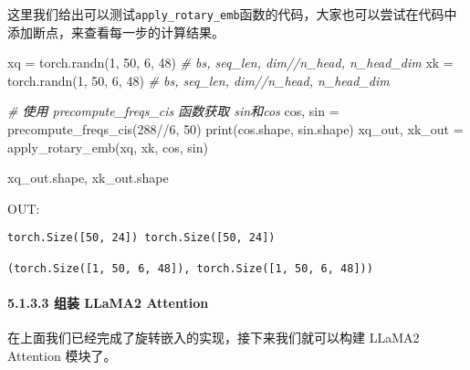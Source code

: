 \documentclass[
]{article}
\newenvironment{Shaded}{}{}
\newcommand{\BuiltInTok}[1]{\textcolor[rgb]{0.00,0.50,0.00}{#1}}
\newcommand{\CommentTok}[1]{\textcolor[rgb]{0.38,0.63,0.69}{\textit{#1}}}
\newcommand{\DecValTok}[1]{\textcolor[rgb]{0.25,0.63,0.44}{#1}}
\newcommand{\NormalTok}[1]{#1}
\newcommand{\OperatorTok}[1]{\textcolor[rgb]{0.40,0.40,0.40}{#1}}
\begin{document}
这里我们给出可以测试\texttt{apply\_rotary\_emb}函数的代码，大家也可以尝试在代码中添加断点，来查看每一步的计算结果。

\begin{Shaded}
\begin{Highlighting}[]
\NormalTok{xq }\OperatorTok{=}\NormalTok{ torch.randn(}\DecValTok{1}\NormalTok{, }\DecValTok{50}\NormalTok{, }\DecValTok{6}\NormalTok{, }\DecValTok{48}\NormalTok{) }\CommentTok{\# bs, seq\_len, dim//n\_head, n\_head\_dim}
\NormalTok{xk }\OperatorTok{=}\NormalTok{ torch.randn(}\DecValTok{1}\NormalTok{, }\DecValTok{50}\NormalTok{, }\DecValTok{6}\NormalTok{, }\DecValTok{48}\NormalTok{) }\CommentTok{\# bs, seq\_len, dim//n\_head, n\_head\_dim}

\CommentTok{\# 使用 precompute\_freqs\_cis 函数获取 sin和cos}
\NormalTok{cos, sin }\OperatorTok{=}\NormalTok{ precompute\_freqs\_cis(}\DecValTok{288}\OperatorTok{//}\DecValTok{6}\NormalTok{, }\DecValTok{50}\NormalTok{)}
\BuiltInTok{print}\NormalTok{(cos.shape, sin.shape)}
\NormalTok{xq\_out, xk\_out }\OperatorTok{=}\NormalTok{ apply\_rotary\_emb(xq, xk, cos, sin)}

\NormalTok{xq\_out.shape, xk\_out.shape}
\end{Highlighting}
\end{Shaded}

OUT:

\begin{verbatim}
torch.Size([50, 24]) torch.Size([50, 24])

(torch.Size([1, 50, 6, 48]), torch.Size([1, 50, 6, 48]))
\end{verbatim}

\paragraph{5.1.3.3 组装 LLaMA2
Attention}\label{ux7ec4ux88c5-llama2-attention}

在上面我们已经完成了旋转嵌入的实现，接下来我们就可以构建 LLaMA2
Attention 模块了。
\end{document}
